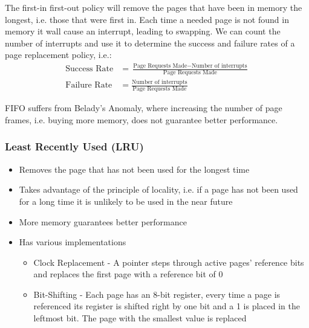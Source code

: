 \documentclass[12pt letter]{report}
\begin{document}
The first-in first-out policy will remove the pages that have been in memory the longest, i.e. those that were first in. Each time a needed page is not found in memory it wall cause an interrupt, leading to swapping. We can count the number of interrupts and use it to determine the success and failure rates of a page replacement policy, i.e.:
\begin{align*}
  \text{Success Rate} & =  \frac{\text{Page Requests Made} - \text{Number of interrupts}}{\text{Page Requests Made}} \\
  \text{Failure Rate} & =  \frac{\text{Number of interrupts}}{\text{Page Requests Made}}
\end{align*}

FIFO suffers from Belady's Anomaly, where increasing the number of page frames, i.e. buying more memory, does not guarantee better performance.

\subsubsection{Least Recently Used (LRU)}
\begin{itemize}
  \item Removes the page that has not been used for the longest time
  \item Takes advantage of the principle of locality, i.e. if a page has not been used for a long time it is unlikely to be used in the near future
  \item More memory guarantees better performance
  \item Has various implementations
        \begin{itemize}
          \item Clock Replacement - A pointer steps through active pages' reference bits and replaces the first page with a reference bit of 0
          \item Bit-Shifting - Each page has an 8-bit register, every time a page is referenced its register is shifted right by one bit and a 1 is placed in the leftmost bit. The page with the smallest value is replaced
        \end{itemize}
\end{itemize}

\end{document}
